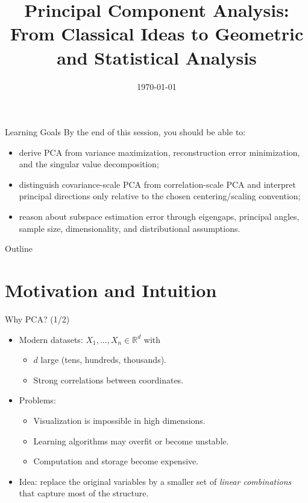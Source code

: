 \documentclass{beamer}
\title[Principal Component Analysis]{Principal Component Analysis:\\
From Classical Ideas to Geometric and Statistical Analysis}
\date{\today}
\newcommand{\R}{\mathbb{R}}
\newcommand{\1}{\mathbbm{1}}
\begin{document}

\begin{frame}
  \titlepage
\end{frame}

\begin{frame}{Learning Goals}
  By the end of this session, you should be able to:
  \begin{itemize}
    \item derive PCA from variance maximization, reconstruction error minimization, and the singular value decomposition;
    \item distinguish covariance-scale PCA from correlation-scale PCA and interpret principal directions only relative to the chosen centering/scaling convention;
    \item reason about subspace estimation error through eigengaps, principal angles, sample size, dimensionality, and distributional assumptions.
  \end{itemize}
\end{frame}

\begin{frame}{Outline}
  \tableofcontents
\end{frame}

\section{Motivation and Intuition}

\begin{frame}{Why PCA? (1/2)} %
  \begin{itemize}
    \item Modern datasets: $X_1,\dots,X_n \in \R^d$ with
    \begin{itemize}
      \item $d$ large (tens, hundreds, thousands).
      \item Strong correlations between coordinates.
    \end{itemize}
    \item Problems:
    \begin{itemize}
      \item Visualization is impossible in high dimensions.
      \item Learning algorithms may overfit or become unstable.
      \item Computation and storage become expensive.
    \end{itemize}
    \item Idea: replace the original variables by a smaller set of
    \emph{linear combinations} that capture most of the structure.
  \end{itemize}
\end{frame}
\end{document}
